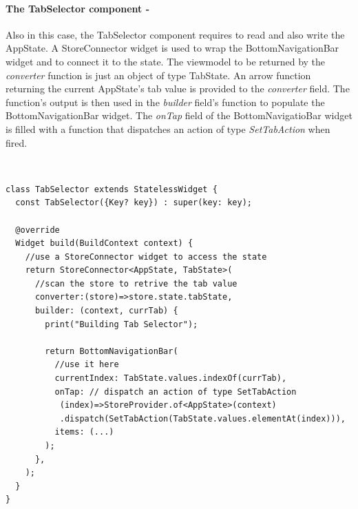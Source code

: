 \paragraph{The TabSelector component - }
\label{subpar:todo_app_bloc_core_state}
Also in this case, the TabSelector component requires to read and also write the AppState. A StoreConnector widget is used to wrap the BottomNavigationBar widget and to connect it to the state. The viewmodel to be returned by the \textit{converter} function is just an object of type TabState. An arrow function returning the current AppState’s tab value is provided to the \textit{converter} field. The function's output is then used in the \textit{builder} field's function to populate the BottomNavigationBar widget. The \textit{onTap} field of the BottomNavigatioBar widget is filled with a function that dispatches an action of type \textit{SetTabAction} when fired.
\begin{code}
\mbox{}\\
 \mbox{}
		\label{code:2.14}
\begin{verbatim}
class TabSelector extends StatelessWidget {
  const TabSelector({Key? key}) : super(key: key);

  @override
  Widget build(BuildContext context) {
    //use a StoreConnector widget to access the state
    return StoreConnector<AppState, TabState>(
      //scan the store to retrive the tab value
      converter:(store)=>store.state.tabState,
      builder: (context, currTab) {
        print("Building Tab Selector");

        return BottomNavigationBar(
          //use it here
          currentIndex: TabState.values.indexOf(currTab),
          onTap: // dispatch an action of type SetTabAction
           (index)=>StoreProvider.of<AppState>(context)
           .dispatch(SetTabAction(TabState.values.elementAt(index))),
          items: (...)
        );
      },
    );
  }
}
\end{verbatim}
\mbox{}
\end{code}

